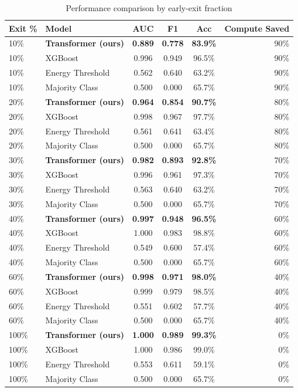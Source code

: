\begin{table}[h]
\centering
\caption{Performance comparison by early-exit fraction}
\label{tab:main_comparison}
\begin{tabular}{llcccr}
\toprule
Exit \% & Model & AUC & F1 & Acc & Compute Saved \\
\midrule
10\% & \textbf{Transformer (ours)} & \textbf{0.889} & \textbf{0.778} & \textbf{83.9\%} & 90\% \\
10\% & XGBoost & 0.996 & 0.949 & 96.5\% & 90\% \\
10\% & Energy Threshold & 0.562 & 0.640 & 63.2\% & 90\% \\
10\% & Majority Class & 0.500 & 0.000 & 65.7\% & 90\% \\
\midrule
20\% & \textbf{Transformer (ours)} & \textbf{0.964} & \textbf{0.854} & \textbf{90.7\%} & 80\% \\
20\% & XGBoost & 0.998 & 0.967 & 97.7\% & 80\% \\
20\% & Energy Threshold & 0.561 & 0.641 & 63.4\% & 80\% \\
20\% & Majority Class & 0.500 & 0.000 & 65.7\% & 80\% \\
\midrule
30\% & \textbf{Transformer (ours)} & \textbf{0.982} & \textbf{0.893} & \textbf{92.8\%} & 70\% \\
30\% & XGBoost & 0.996 & 0.961 & 97.3\% & 70\% \\
30\% & Energy Threshold & 0.563 & 0.640 & 63.2\% & 70\% \\
30\% & Majority Class & 0.500 & 0.000 & 65.7\% & 70\% \\
\midrule
40\% & \textbf{Transformer (ours)} & \textbf{0.997} & \textbf{0.948} & \textbf{96.5\%} & 60\% \\
40\% & XGBoost & 1.000 & 0.983 & 98.8\% & 60\% \\
40\% & Energy Threshold & 0.549 & 0.600 & 57.4\% & 60\% \\
40\% & Majority Class & 0.500 & 0.000 & 65.7\% & 60\% \\
\midrule
60\% & \textbf{Transformer (ours)} & \textbf{0.998} & \textbf{0.971} & \textbf{98.0\%} & 40\% \\
60\% & XGBoost & 0.999 & 0.979 & 98.5\% & 40\% \\
60\% & Energy Threshold & 0.551 & 0.602 & 57.7\% & 40\% \\
60\% & Majority Class & 0.500 & 0.000 & 65.7\% & 40\% \\
\midrule
100\% & \textbf{Transformer (ours)} & \textbf{1.000} & \textbf{0.989} & \textbf{99.3\%} & 0\% \\
100\% & XGBoost & 1.000 & 0.986 & 99.0\% & 0\% \\
100\% & Energy Threshold & 0.553 & 0.611 & 59.1\% & 0\% \\
100\% & Majority Class & 0.500 & 0.000 & 65.7\% & 0\% \\
\bottomrule
\end{tabular}
\end{table}